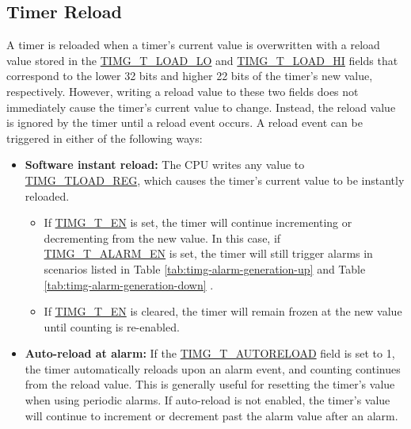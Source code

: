 \documentclass[main\_\_EN.tex]{subfiles}
\begin{document}
\subsection{Timer Reload}
\label{sec:timg-func-descr-reload}

A timer is reloaded when a timer's current value is overwritten with a reload value stored in the \hyperref[fielddesc:TIMGTXLOADLO]{TIMG\_T\_LOAD\_LO} and \hyperref[fielddesc:TIMGTXLOADHI]{TIMG\_T\_LOAD\_HI} fields that correspond to the lower 32 bits and higher 22 bits of the timer's new value, respectively. However, writing a reload value to these two fields does not immediately cause the timer's current value to change. Instead, the reload value is ignored by the timer until a reload event occurs. A reload event can be triggered in either of the following ways:

\begin{itemize}
    \item \textbf{Software instant reload:} The CPU writes any value to \hyperref[regdesc:TIMGTXLOADREG]{TIMG\_TLOAD\_REG}, which causes the timer's current value to be instantly reloaded.
    \begin{itemize}
        \item If \hyperref[fielddesc:TIMGTXEN]{TIMG\_T\_EN} is set, the timer will continue incrementing or decrementing from the new value. In this case, if \hyperref[fielddesc:TIMGTXALARMEN]{TIMG\_T\_ALARM\_EN} is set, the timer will still trigger alarms in scenarios listed in Table \ref{tab:timg-alarm-generation-up} \textit{} and Table \ref{tab:timg-alarm-generation-down} \textit{}.
        \item If \hyperref[fielddesc:TIMGTXEN]{TIMG\_T\_EN} is cleared, the timer will remain frozen at the new value until counting is re-enabled.
    \end{itemize}
    \item \textbf{Auto-reload at alarm:} If the \hyperref[fielddesc:TIMGTXAUTORELOAD]{TIMG\_T\_AUTORELOAD} field is set to 1, the timer automatically reloads upon an alarm event, and counting continues from the reload value. This is generally useful for resetting the timer's value when using periodic alarms. If auto-reload is not enabled, the timer's value will continue to increment or decrement past the alarm value after an alarm.
\end{itemize}
\end{document}
